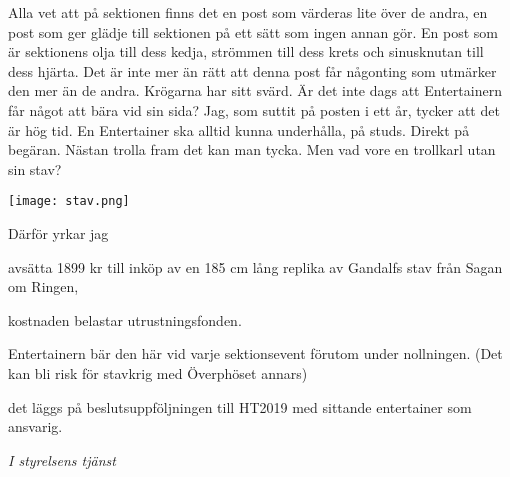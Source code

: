 \documentclass[../_main/handlingar.tex]{subfiles}
\begin{document}

Alla vet att på sektionen finns det en post som värderas lite över de andra, en post som ger glädje till
sektionen på ett sätt som ingen annan gör. En post som är sektionens olja till dess kedja, strömmen
till dess krets och sinusknutan till dess hjärta. Det är inte mer än rätt att denna post får någonting
som utmärker den mer än de andra. Krögarna har sitt svärd. Är det inte dags att Entertainern får
något att bära vid sin sida? Jag, som suttit på posten i ett år, tycker att det är hög tid. En Entertainer
ska alltid kunna underhålla, på studs. Direkt på begäran. Nästan trolla fram det kan man tycka. Men
vad vore en trollkarl utan sin stav? 


\begin{center}
    \texttt{[image: stav.png]}
\end{center}

Därför yrkar jag
\begin{attsatser}
    \att avsätta 1899 kr till inköp av en 185 cm lång replika av Gandalfs stav från Sagan om Ringen,
    
    \att kostnaden belastar utrustningsfonden.

    \att Entertainern bär den här vid varje sektionsevent förutom under nollningen. (Det kan bli risk för
    stavkrig med Överphöset annars)

    \att det läggs på beslutsuppföljningen till HT2019 med sittande entertainer som ansvarig. 
\end{attsatser}

\begin{signatures}{1}
    \emph{I styrelsens tjänst}
    \signature{Adam Belfrage}{}
    
\end{signatures}
\end{document}
